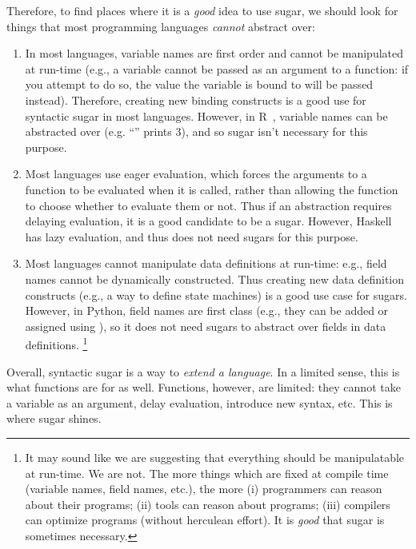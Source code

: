 Therefore, to find places where it is a \emph{good} idea to use sugar,
we should look for things that most programming languages
\emph{cannot} abstract over:
\begin{enumerate}
  \item In most languages, variable names are first order and cannot
    be manipulated at run-time (e.g., a variable cannot be passed as
    an argument to a function: if you attempt to do so, the value the
    variable is bound to will be passed instead). Therefore, creating
    new binding constructs is a good use for syntactic sugar in most
    languages. However, in R~\cite{rlang}, variable names can be abstracted
    over (e.g. ``'' prints 3), and so sugar isn't
    necessary for this purpose.
  \item Most languages use eager evaluation,
    which forces the arguments to a function to be
    evaluated when it is called, rather than allowing the function to
    choose whether to
    evaluate them or not. Thus if an abstraction requires delaying
    evaluation, it is a good candidate to be a sugar. However, Haskell
    has lazy evaluation, and thus does not need sugars for this purpose.
  \item Most languages cannot manipulate data definitions at run-time:
    e.g., field names cannot be dynamically constructed. Thus creating
    new data definition constructs (e.g., a way to define state
    machines) is a good use case for sugars. However, in Python, field
    names are first class (e.g., they can be added or assigned using
    ), so it does not need sugars to abstract over fields
    in data definitions.%
    \footnote{
    It may sound like we are suggesting that everything should be
    manipulatable at run-time. We are not. The more
    things which are fixed at compile time (variable names, field
    names, etc.), the more (i) programmers can reason about their
    programs; (ii) tools can reason about programs; (iii) compilers
    can optimize programs (without herculean effort). It is
    \emph{good} that sugar is sometimes necessary.
  }
\end{enumerate}

Overall, syntactic sugar is a way to \emph{extend a language}.
In a limited sense, this is what functions are for as well.
Functions, however, are limited: they cannot take a variable as an
argument, delay evaluation, introduce new syntax, etc. This is where
sugar shines.


